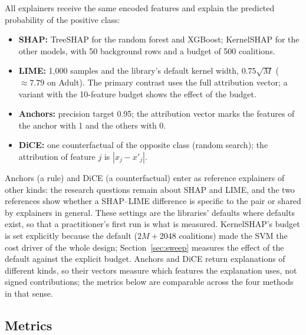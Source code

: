 \documentclass[11pt,a4paper]{article}
\begin{document}
All explainers receive the same encoded features and explain the predicted
probability of the positive class:
\begin{itemize}
\item \textbf{SHAP:} TreeSHAP for the random forest and XGBoost;
KernelSHAP for the other models, with 50 background rows and a budget of
500 coalitions.
\item \textbf{LIME:} 1,000 samples and the library's default kernel width,
$0.75\sqrt{M}$ ($\approx 7.79$ on Adult). The primary contrast uses the full
attribution vector; a variant with the 10-feature budget shows the effect
of the budget.
\item \textbf{Anchors:} precision target 0.95; the attribution vector marks
the features of the anchor with 1 and the others with 0.
\item \textbf{DiCE:} one counterfactual of the opposite class (random
search); the attribution of feature $j$ is $|x_j - x'_j|$.
\end{itemize}
Anchors (a rule) and DiCE (a counterfactual) enter as reference explainers
of other kinds: the research questions remain about SHAP and LIME, and the
two references show whether a SHAP--LIME difference is specific to the pair
or shared by explainers in general.
These settings are the libraries' defaults where defaults exist, so that a
practitioner's first run is what is measured. KernelSHAP's budget is set
explicitly because the default ($2M + 2048$ coalitions) made the SVM the
cost driver of the whole design; Section~\ref{sec:sweep} measures the effect
of the default against the explicit budget. Anchors and DiCE return
explanations of different kinds, so their vectors measure which features the
explanation uses, not signed contributions; the metrics below are
comparable across the four methods in that sense.

\subsection{Metrics}
\label{sec:metrics}
\end{document}
